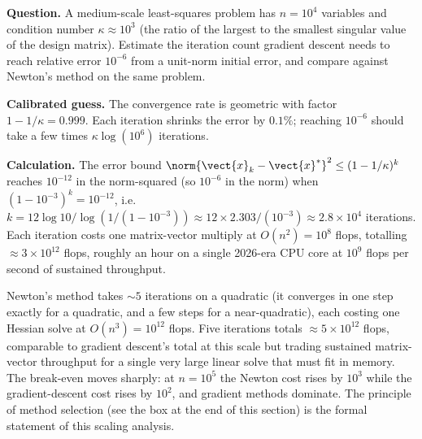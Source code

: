

\begin{estimation}
\textbf{Question.} A medium-scale least-squares problem has $n =
10^{4}$ variables and condition number $\kappa \approx 10^{3}$
(the ratio of the largest to the smallest singular value of the
design matrix). Estimate the iteration count gradient descent
needs to reach relative error $10^{-6}$ from a unit-norm initial
error, and compare against Newton's method on the same problem.

\textbf{Calibrated guess.} The convergence rate is geometric with
factor $1 - 1/\kappa = 0.999$. Each iteration shrinks the error by
$0.1\%$; reaching $10^{-6}$ should take a few times $\kappa
\log(10^{6})$ iterations.

\textbf{Calculation.} The error bound $\norm{\vect{x}_{k} -
\vect{x}^{*}}^{2} \leq (1 - 1/\kappa)^{k}$ reaches $10^{-12}$ in
the norm-squared (so $10^{-6}$ in the norm) when $(1 - 10^{-3})^{k}
= 10^{-12}$, i.e.\ $k = 12 \log 10 / \log(1/(1 - 10^{-3})) \approx
12 \times 2.303 / (10^{-3}) \approx 2.8 \times 10^{4}$ iterations.
Each iteration costs one matrix-vector multiply at
$O(n^{2}) = 10^{8}$ flops, totalling $\approx 3 \times 10^{12}$
flops, roughly an hour on a single 2026-era CPU core at $10^{9}$
flops per second of sustained throughput.

Newton's method takes $\sim 5$ iterations on a quadratic (it
converges in one step exactly for a quadratic, and a few steps for
a near-quadratic), each costing one Hessian solve at $O(n^{3}) =
10^{12}$ flops. Five iterations totals $\approx 5 \times 10^{12}$
flops, comparable to gradient descent's total at this scale but
trading sustained matrix-vector throughput for a single very large
linear solve that must fit in memory. The break-even moves
sharply: at $n = 10^{5}$ the Newton cost rises by $10^{3}$ while
the gradient-descent cost rises by $10^{2}$, and gradient methods
dominate. The principle of method selection (see the box at the
end of this section) is the formal statement of this scaling
analysis.
\end{estimation}

